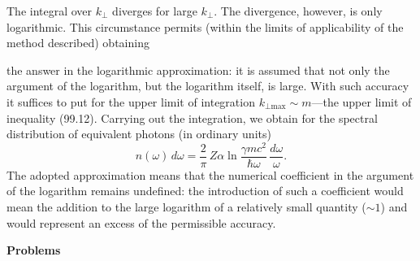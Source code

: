 The integral over $k_\perp$ diverges for large $k_\perp$. The divergence, however, is only logarithmic. This circumstance permits (within the limits of applicability of the method described) obtaining


the answer in the logarithmic approximation: it is assumed that not only the argument of the logarithm, but the logarithm itself, is large. With such accuracy it suffices to put for the upper limit of integration $k_{\perp\text{max}} \sim m$---the upper limit of inequality (99.12). Carrying out the integration, we obtain for the spectral distribution of equivalent photons (in ordinary units)
\begin{equation}
n(\omega)\,d\omega = \frac{2}{\pi}\,Z\alpha\ln\frac{\gamma mc^2}{\hbar\omega}\,\frac{d\omega}{\omega}.
\label{eq:99.16}
\end{equation}
The adopted approximation means that the numerical coefficient in the argument of the logarithm remains undefined: the introduction of such a coefficient would mean the addition to the large logarithm of a relatively small quantity ($\sim 1$) and would represent an excess of the permissible accuracy.

\bigskip

\noindent\textbf{Problems}

